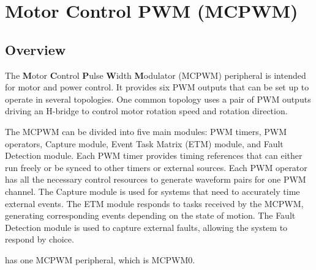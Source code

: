 \documentclass[main\_\_EN.tex]{subfiles}
\begin{document}

\ifglobal
\else
    \listoftodos
    {\let\clearpage\relax \listofdonetodos}
    \tableofcontents
\fi










\hypertarget{mcpwm}{}
\chapter{Motor Control PWM (MCPWM)}
\label{mod:mcpwm}

\section{Overview}

The \textbf{M}otor \textbf{C}ontrol \textbf{P}ulse \textbf{W}idth \textbf{M}odulator (MCPWM) peripheral is intended for motor and power control. It provides six PWM outputs that can be set up to operate in several topologies. One common topology uses a pair of PWM outputs driving an H-bridge to control motor rotation speed and rotation direction.

The MCPWM can be divided into five main modules: PWM timers, PWM operators, Capture module, Event Task Matrix (ETM) module, and Fault Detection module. Each PWM timer provides timing references that can either run freely or be synced to other timers or external sources. Each PWM operator has all the necessary control resources to generate waveform pairs for one PWM channel. The Capture module is used for systems that need to accurately time external events. The ETM module responds to tasks received by the MCPWM, generating corresponding events depending on the state of motion. The Fault Detection module is used to capture external faults, allowing the system to respond by choice.

\chipname{} has one MCPWM peripheral, which is MCPWM0.
\end{document}
